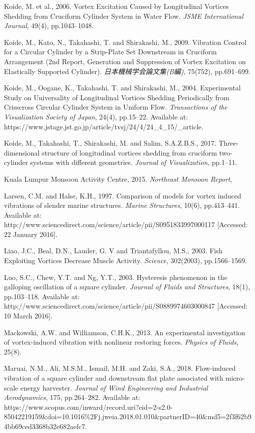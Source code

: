 \documentclass[]{article}
\begin{document}
Koide, M. et al., 2006. Vortex Excitation Caused by Longitudinal
Vortices Shedding from Cruciform Cylinder System in Water Flow.
\emph{JSME International Journal}, 49(4), pp.1043--1048.

Koide, M., Kato, N., Takahashi, T. and Shirakashi, M., 2009. Vibration
Control for a Circular Cylinder by a Strip-Plate Set Downstream in
Cruciform Arrangement (2nd Report, Generation and Suppression of Vortex
Excitation on Elastically Supported Cylinder).
\emph{日本機械学会論文集(B編)}, 75(752), pp.691--699.

Koide, M., Oogane, K., Takahashi, T. and Shirakashi, M., 2004.
Experimental Study on Universality of Longitudinal Vortices Shedding
Periodically from Crisscross Circular Cylinder System in Uniform Flow.
\emph{Transactions of the Visualization Society of Japan}, 24(4),
pp.15--22. Available at:
https://www.jstage.jst.go.jp/article/tvsj/24/4/24\_4\_15/\_article.

Koide, M., Takahashi, T., Shirakashi, M. and Salim, S.A.Z.B.S., 2017.
Three-dimensional structure of longitudinal vortices shedding from
cruciform two-cylinder systems with different geometries. \emph{Journal
of Visualization}, pp.1--11.

Kuala Lumpur Monsoon Activity Centre, 2015. \emph{Northeast Monsoon
Report},

Larsen, C.M. and Halse, K.H., 1997. Comparison of models for vortex
induced vibrations of slender marine structures. \emph{Marine
Structures}, 10(6), pp.413--441. Available at:
http://www.sciencedirect.com/science/article/pii/S0951833997000117
{[}Accessed: 22 January 2016{]}.

Liao, J.C., Beal, D.N., Lauder, G. V and Triantafyllou, M.S., 2003. Fish
Exploiting Vortices Decrease Muscle Activity. \emph{Science}, 302(2003),
pp.1566--1569.

Luo, S.C., Chew, Y.T. and Ng, Y.T., 2003. Hysteresis phenomenon in the
galloping oscillation of a square cylinder. \emph{Journal of Fluids and
Structures}, 18(1), pp.103--118. Available at:
http://www.sciencedirect.com/science/article/pii/S0889974603000847
{[}Accessed: 10 March 2016{]}.

Mackowski, A.W. and Williamson, C.H.K., 2013. An experimental
investigation of vortex-induced vibration with nonlinear restoring
forces. \emph{Physics of Fluids}, 25(8).

Maruai, N.M., Ali, M.S.M., Ismail, M.H. and Zaki, S.A., 2018.
Flow-induced vibration of a square cylinder and downstream flat plate
associated with micro-scale energy harvester. \emph{Journal of Wind
Engineering and Industrial Aerodynamics}, 175, pp.264--282. Available
at:
https://www.scopus.com/inward/record.uri?eid=2-s2.0-85042219159\&doi=10.1016\%2Fj.jweia.2018.01.010\&partnerID=40\&md5=2f3f62b94bb69ced3368b32e682aefc7.
\end{document}
